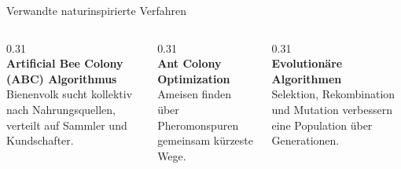 \begin{frame}{Verwandte naturinspirierte Verfahren}
\vspace{1em}
\begin{columns}[t]
\begin{column}{0.31\textwidth}
\centering
{}\\[1em]
\textbf{Artificial Bee Colony (ABC) Algorithmus}\\[0.6em]
\footnotesize Bienenvolk sucht kollektiv nach Nahrungsquellen, verteilt auf Sammler und Kundschafter.
\end{column}
\begin{column}{0.31\textwidth}
\centering
{}\\[1em]
\textbf{Ant Colony Optimization}\\[0.6em]
\footnotesize Ameisen finden über Pheromonspuren gemeinsam kürzeste Wege.
\end{column}
\begin{column}{0.31\textwidth}
\centering
{}\\[1em]
\textbf{Evolutionäre Algorithmen}\\[0.6em]
\footnotesize Selektion, Rekombination und Mutation verbessern eine Population über Generationen.
\end{column}
\end{columns}
\vspace{1em}
\end{frame}

